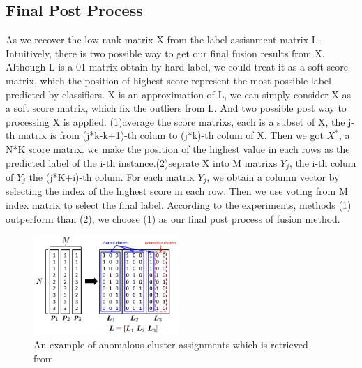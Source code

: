 \documentclass[letterpaper]{article}
\def\bL{{\bf L}}
\def\yanred{\textcolor{red}}
\begin{document}
\subsection{Final Post Process}
As we recover the low rank matrix X from the label assisnment matrix L. Intuitively, there is two possible way to get our final fusion results from X. Although L is a 01 matrix obtain by hard label, we could treat it as a soft score matrix, which the position of highest score represent the most possible label predicted by classifiers. X is an approximation of L, we can simply consider X as a soft score matrix, which fix the outliers from L. And two possible post way to processing X is applied.
(1)average the score matrixs, each is a subset of X, the j-th matrix is from (j*k-k+1)-th colum to (j*k)-th colum of X. Then we got $X^*$, a N*K score matrix. we make the position of the highest value in each rows as the predicted label of the i-th instance.(2)seprate X into M matrixs $Y_j$, the i-th colum of $Y_j$ the (j*K+i)-th colum. For each matrix $Y_j$, we obtain a column vector by selecting the index of the highest score in each row. Then we use voting from M index matrix to select the final label.
According to the experiments, methods (1) outperform than (2), we choose (1) as our final post process of fusion method.

\begin{figure}
  \centering
  \includegraphics[width=0.49\textwidth]{resource/anomalous_clusters.png}
  \caption{An example of anomalous cluster assignments which is retrieved from~\cite{gaoijcai2016robust}}\label{fig:anomalous_cluster}
\end{figure}
\end{document}
